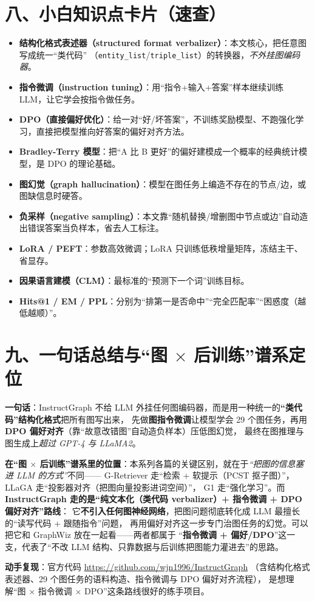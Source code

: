 \documentclass[11pt,UTF8,fontset=fandol]{ctexart}
\begin{document}
\section{八、小白知识点卡片（速查）}
\begin{itemize}[leftmargin=2em]
  \item \textbf{结构化格式表述器（structured format verbalizer）}：本文核心，把任意图写成统一“类代码”
        （\texttt{entity\_list}/\texttt{triple\_list}）的转换器，\emph{不外挂图编码器}。
  \item \textbf{指令微调（instruction tuning）}：用“指令+输入+答案”样本继续训练 LLM，让它学会按指令做任务。
  \item \textbf{DPO（直接偏好优化）}：给一对“好/坏答案”，不训练奖励模型、不跑强化学习，直接把模型推向好答案的偏好对齐方法。
  \item \textbf{Bradley-Terry 模型}：把“A 比 B 更好”的偏好建模成一个概率的经典统计模型，是 DPO 的理论基础。
  \item \textbf{图幻觉（graph hallucination）}：模型在图任务上编造不存在的节点/边，或图缺信息时硬答。
  \item \textbf{负采样（negative sampling）}：本文靠“随机替换/增删图中节点或边”自动造出错误答案当负样本，省去人工标注。
  \item \textbf{LoRA / PEFT}：参数高效微调；LoRA 只训练低秩增量矩阵，冻结主干、省显存。
  \item \textbf{因果语言建模（CLM）}：最标准的“预测下一个词”训练目标。
  \item \textbf{Hits@1 / EM / PPL}：分别为“排第一是否命中”“完全匹配率”“困惑度（越低越顺）”。
\end{itemize}

\section{九、一句话总结与“图 $\times$ 后训练”谱系定位}

\textbf{一句话}：InstructGraph 不给 LLM 外挂任何图编码器，而是用一种统一的\textbf{“类代码”结构化格式}把所有图写出来，
先做\textbf{图指令微调}让模型学会 29 个图任务，再用\textbf{DPO 偏好对齐}（靠“故意改错图”自动造负样本）压低图幻觉，
最终在图推理与图生成上\emph{超过 GPT-4 与 LLaMA2}。

\textbf{在“图 $\times$ 后训练”谱系里的位置}：本系列各篇的关键区别，就在于\emph{“把图的信息塞进 LLM 的方式”}不同——
G-Retriever 走“检索 + 软提示（PCST 抠子图）”，LLaGA 走“投影器对齐（把图向量投影进词空间）”，
G1 走“强化学习”。而 \textbf{InstructGraph 走的是“纯文本化（类代码 verbalizer）+ 指令微调 + DPO 偏好对齐”路线}：
它\textbf{不引入任何图神经网络}，把图问题彻底转化成 LLM 最擅长的“读写代码 + 跟随指令”问题，
再用偏好对齐这一步专门治图任务的幻觉。可以把它和 GraphWiz 放在一起看——两者都属于
“\textbf{指令微调 + 偏好/DPO}”这一支，代表了“不改 LLM 结构、只靠数据与后训练把图能力灌进去”的思路。

\textbf{动手复现}：官方代码 \url{https://github.com/wjn1996/InstructGraph}
（含结构化格式表述器、29 个图任务的语料构造、指令微调与 DPO 偏好对齐流程），
是想理解“图 $\times$ 指令微调 $\times$ DPO”这条路线很好的练手项目。
\end{document}
